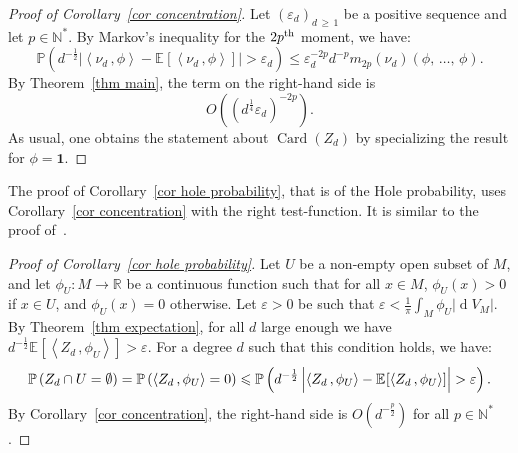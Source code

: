 \documentclass[10pt]{amsart}
\theoremstyle{definition}\newtheorem{defi}[theo]{Definition}\newtheorem{rema}[theo]{Remark}\newtheorem{exam}[theo]{Example}\newtheorem{exem}[theo]{Example}\newtheorem{nota}[theo]{Notation}
\DeclareMathOperator{\card}{Card}
\DeclareMathOperator{\dmesure}{d}
\newcommand{\N}{\mathbb{N}}
\newcommand{\R}{\mathbb{R}}
\renewcommand{\P}{\mathbb{P}}
\newcommand{\bfun}{\mathbf{1}}
\newcommand{\esp}[2][]{\mathbb{E}_{#1}\!\left[#2 \right]}
\newcommand{\norm}[1]{\left\lvert #1 \right\rvert}
\newcommand{\prsc}[2]{\left\langle #1\,, #2 \right\rangle}
\newcommand{\rmes}[1]{\norm{\dmesure\! V_{#1}}}
\renewcommand{\epsilon}{\varepsilon}
\renewcommand{\geq}{\geqslant}
\renewcommand{\leq}{\leqslant}
\begin{document}
\begin{proof}[Proof of Corollary~\ref{cor concentration}]
Let $(\epsilon_d)_{d\,\geq\,1}$ be a positive sequence and let $p \in \N^*$. By Markov's inequality for the $2p^{\rm th}$ moment, we have:
\[
\P\left(d^{-\frac{1}{2}}\norm{\prsc{\nu_d}{\phi} - \esp{\prsc{\nu_d}{\phi}}} > \epsilon_d \right) \leq \epsilon_d^{-2p} d^{-p} m_{2p}(\nu_d)(\phi,\,\dots,\,\phi).
\]
By Theorem~\ref{thm main}, the term on the right-hand side is
\[O\!\left((d^\frac{1}{4}\epsilon_d)^{-2p}\right).
\]
As usual, one obtains the statement about $\card(Z_d)$ by specializing the result for $\phi = \bfun$.
\end{proof}

The proof of Corollary~\ref{cor hole probability}, that is of the Hole probability, uses Corollary~\ref{cor concentration} with the right test-function. It is similar to the proof of~\cite[Corollary~1.10]{Let2019}.

\begin{proof}[{Proof of Corollary~\ref{cor hole probability}}]
Let $U$ be a non-empty open subset of $M$, and let $\phi_U:M \to \R$ be a continuous function such that for all $x \in M$, $\phi_U(x)>0$ if $x \in U$, and $\phi_U(x)=0$ otherwise. Let $\epsilon >0$ be such that $\epsilon < \tfrac{1}{\pi} \int_M \phi_U \rmes{M}$. By Theorem~\ref{thm expectation}, for all $d$ large enough we have $d^{-\frac{1}{2}}\esp{\prsc{Z_d}{\phi_U}} > \epsilon$. For a degree $d$ such that this condition holds, we have:
\[
\P\left(Z_d \cap U = \emptyset\right) = \P\left(\prsc{Z_d}{\phi_U} = 0\right) \leq \P\left(d^{-\frac{1}{2}}\norm{\prsc{Z_d}{\phi_U}-\rule{0pt}{10pt}\esp{\prsc{Z_d}{\phi_U}}}> \epsilon\right).
\]
By Corollary~\ref{cor concentration}, the right-hand side is $O(d^{-\frac{p}{2}})$ for all $p \in \N^*$.
\end{proof}
\end{document}
